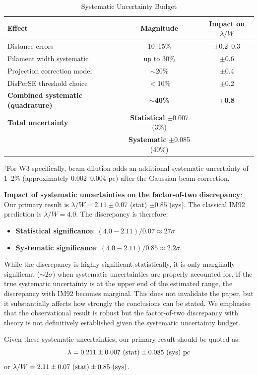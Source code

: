 \documentclass[11pt,a4paper]{article}
\begin{document}
\begin{table}[H]
\centering
\caption{Systematic Uncertainty Budget}
\label{tab:uncertainties}
\begin{tabular}{lcc}
\toprule
Effect & Magnitude & Impact on $\lambda/W$ \\
\midrule
Distance errors & 10--15\% & $\pm$0.2--0.3 \\
Filament width systematic & up to 30\% & $\pm$0.6 \\
Projection correction model & $\sim$20\% & $\pm$0.4 \\
DisPerSE threshold choice & $<$10\% & $\pm$0.2 \\
\textbf{Combined systematic (quadrature)} & \textbf{$\sim$40\%} & \textbf{$\pm$0.8} \\
\midrule
\textbf{Total uncertainty} & \textbf{Statistical} $\pm$0.007 (3\%) & \\
& \textbf{Systematic} $\pm$0.085 (40\%) & \\
\bottomrule
\end{tabular}
\vspace{-0.5em}
\small{$^{\dagger}$For W3 specifically, beam dilution adds an additional systematic uncertainty of 1--2\% (approximately 0.002--0.004 pc) after the Gaussian beam correction.}
\end{table}

\textbf{Impact of systematic uncertainties on the factor-of-two discrepancy}: Our primary result is $\lambda/W = 2.11 \pm 0.07$ (stat) $\pm 0.85$ (sys). The classical IM92 prediction is $\lambda/W = 4.0$. The discrepancy is therefore:
\begin{itemize}
    \item \textbf{Statistical significance}: $(4.0 - 2.11) / 0.07 \approx 27\sigma$
    \item \textbf{Systematic significance}: $(4.0 - 2.11) / 0.85 \approx 2.2\sigma$
\end{itemize}
While the discrepancy is highly significant statistically, it is only marginally significant ($\sim2\sigma$) when systematic uncertainties are properly accounted for. If the true systematic uncertainty is at the upper end of the estimated range, the discrepancy with IM92 becomes marginal. This does not invalidate the paper, but it substantially affects how strongly the conclusions can be stated. We emphasise that the observational result is robust but the factor-of-two discrepancy with theory is not definitively established given the systematic uncertainty budget.

Given these systematic uncertainties, our primary result should be quoted as:
\begin{equation}
\lambda = 0.211 \pm 0.007~({\rm stat}) \pm 0.085~({\rm sys})~{\rm pc}
\end{equation}
or $\lambda/W = 2.11 \pm 0.07~({\rm stat}) \pm 0.85~({\rm sys})$.
\end{document}
